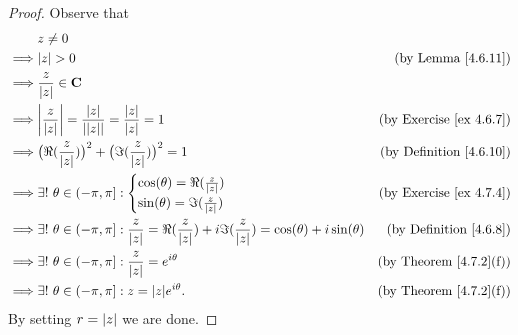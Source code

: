 \begin{proof}
    Observe that
    \begin{align*}
                 & z \neq 0                                                                                                                                                                       \\
        \implies & \abs{z} > 0                                                                                                                              & \text{(by Lemma \ref{4.6.11})}      \\
        \implies & \frac{z}{\abs{z}} \in \C                                                                                                                                                       \\
        \implies & \abs{\frac{z}{\abs{z}}} = \frac{\abs{z}}{\abs{\abs{z}}} = \frac{\abs{z}}{\abs{z}} = 1                                                    & \text{(by Exercise \ref{ex 4.6.7})} \\
        \implies & \big(\Re(\frac{z}{\abs{z}})\big)^2 + \big(\Im(\frac{z}{\abs{z}})\big)^2 = 1                                                              & \text{(by Definition \ref{4.6.10})} \\
        \implies & \exists!\ \theta \in (-\pi, \pi] : \begin{cases}
                                                          \cos(\theta) = \Re(\frac{z}{\abs{z}}) \\
                                                          \sin(\theta) = \Im(\frac{z}{\abs{z}})
                                                      \end{cases}                                                                  & \text{(by Exercise \ref{ex 4.7.4})}                          \\
        \implies & \exists!\ \theta \in (-\pi, \pi] : \frac{z}{\abs{z}} = \Re(\frac{z}{\abs{z}}) + i \Im(\frac{z}{\abs{z}}) = \cos(\theta) + i \sin(\theta) & \text{(by Definition \ref{4.6.8})}  \\
        \implies & \exists!\ \theta \in (-\pi, \pi] : \frac{z}{\abs{z}} = e^{i \theta}                                                                      & \text{(by Theorem \ref{4.7.2}(f))}  \\
        \implies & \exists!\ \theta \in (-\pi, \pi] : z = \abs{z} e^{i \theta}.                                                                             & \text{(by Theorem \ref{4.7.2}(f))}
    \end{align*}
    By setting \(r = \left\lvert z\right\rvert\) we are done.
\end{proof}

